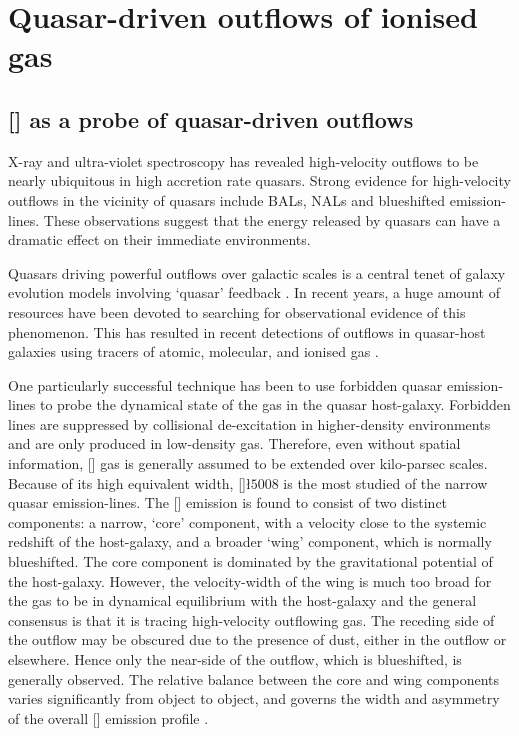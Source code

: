 
\chapter{Quasar-driven outflows of ionised gas}
\label{ch:nlr} 

\section{[] as a probe of quasar-driven outflows}

X-ray and ultra-violet spectroscopy has revealed high-velocity outflows to be nearly ubiquitous in high accretion rate quasars.
Strong evidence for high-velocity outflows in the vicinity of quasars include BALs, NALs and blueshifted emission-lines. 
These observations suggest that the energy released by quasars can have a dramatic effect on their immediate environments. 

Quasars driving powerful outflows over galactic scales is a central tenet of galaxy evolution models involving `quasar' feedback \citep[e.g.][]{silk98,king03,dimatteo05,king15}.
In recent years, a huge amount of resources have been devoted to searching for observational evidence of this phenomenon.  
This has resulted in recent detections of outflows in quasar-host galaxies using tracers of atomic, molecular, and ionised gas \citep[e.g.][]{nesvadba06,arav08,nesvadba08,moe09,alexander10,dunn10,feruglio10,nesvadba10,alatalo11,harrison12,harrison14,cimatti13,rupke13,veilleux13,cicone14,nardini15}.  

One particularly successful technique has been to use forbidden quasar emission-lines to probe the dynamical state of the gas in the quasar host-galaxy. 
Forbidden lines are suppressed by collisional de-excitation in higher-density environments and are only produced in low-density gas.
Therefore, even without spatial information, [] gas is generally assumed to be extended over kilo-parsec scales. 
Because of its high equivalent width, []\l$5008$ is the most studied of the narrow quasar emission-lines. 
The [] emission is found to consist of two distinct components: a narrow, `core' component, with a velocity close to the systemic redshift of the host-galaxy, and a broader `wing' component, which is normally blueshifted. 
The core component is dominated by the gravitational potential of the host-galaxy.
However, the velocity-width of the wing is much too broad for the gas to be in dynamical equilibrium with the host-galaxy \citep[e.g.][]{liu13} and the general consensus is that it is tracing high-velocity outflowing gas. The receding side of the outflow may be obscured due to the presence of dust, either in the outflow or elsewhere.
Hence only the near-side of the outflow, which is blueshifted, is generally observed. 
The relative balance between the core and wing components varies significantly from object to object, and governs the width and asymmetry of the overall [] emission profile \citep[e.g.][]{shen14}. 

